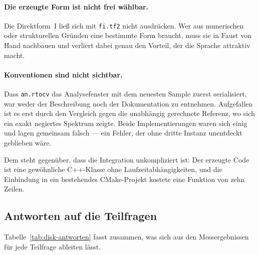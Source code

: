 \paragraph{Die erzeugte Form ist nicht frei wählbar.}
Die Direktform~I ließ sich mit \texttt{fi.tf2} nicht ausdrücken. Wer aus numerischen oder strukturellen Gründen eine bestimmte Form braucht, muss sie in Faust von Hand nachbauen und verliert dabei genau den Vorteil, der die Sprache attraktiv macht.

\paragraph{Konventionen sind nicht sichtbar.}
Dass \texttt{an.rtocv} das Analysefenster mit dem neuesten Sample zuerst serialisiert, war weder der Beschreibung noch der Dokumentation zu entnehmen. Aufgefallen ist es erst durch den Vergleich gegen die unabhängig gerechnete Referenz, wo sich ein exakt negiertes Spektrum zeigte. Beide Implementierungen waren sich einig und lagen gemeinsam falsch --- ein Fehler, der ohne dritte Instanz unentdeckt geblieben wäre.

Dem steht gegenüber, dass die Integration unkompliziert ist: Der erzeugte Code ist eine gewöhnliche C++-Klasse ohne Laufzeitabhängigkeiten, und die Einbindung in ein bestehendes CMake-Projekt kostete eine Funktion von zehn Zeilen.

\subsection{Antworten auf die Teilfragen}
\label{subsec:disk-teilfragen}

Tabelle~\ref{tab:disk-antworten} fasst zusammen, was sich aus den Messergebnissen für jede Teilfrage ableiten lässt.

